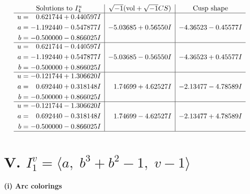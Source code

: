 \documentclass[1p]{elsarticle_modified}
\theoremstyle{definition}
\newcommand{\I}{\sqrt{-1}}
\begin{document}
$$\begin{array}{c|c|c}  
\text{Solutions to }I^u_{4}& \I (\text{vol} + \sqrt{-1}CS) & \text{Cusp shape}\\
 \hline 
\begin{aligned}
u &= \phantom{-}0.621744 + 0.440597 I \\
a &= -1.192440 - 0.547877 I \\
b &= -0.500000 - 0.866025 I\end{aligned}
 & -5.03685 + 0.56550 I & -4.36523 - 0.45577 I \\ \hline\begin{aligned}
u &= \phantom{-}0.621744 - 0.440597 I \\
a &= -1.192440 + 0.547877 I \\
b &= -0.500000 + 0.866025 I\end{aligned}
 & -5.03685 - 0.56550 I & -4.36523 + 0.45577 I \\ \hline\begin{aligned}
u &= -0.121744 + 1.306620 I \\
a &= \phantom{-}0.692440 + 0.318148 I \\
b &= -0.500000 + 0.866025 I\end{aligned}
 & \phantom{-}1.74699 + 4.62527 I & -2.13477 - 4.78589 I \\ \hline\begin{aligned}
u &= -0.121744 - 1.306620 I \\
a &= \phantom{-}0.692440 - 0.318148 I \\
b &= -0.500000 - 0.866025 I\end{aligned}
 & \phantom{-}1.74699 - 4.62527 I & -2.13477 + 4.78589 I\\
 \hline 
 \end{array}$$\newpage\newpage\renewcommand{\arraystretch}{1}
\centering \section*{V. $I^v_{1}= \langle a,\;b^3+b^2-1,\;v-1 \rangle$}
\flushleft \textbf{(i) Arc colorings}\\
\end{document}
